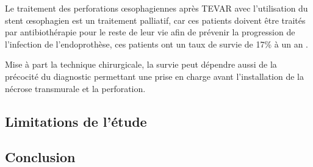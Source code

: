 \documentclass[./tfe.tex]{subfiles}
\begin{document}


Le traitement des perforations œsophagiennes après TEVAR avec l'utilisation du stent œsophagien est un traitement palliatif, car ces patients doivent être traités par antibiothérapie pour le reste de leur vie afin de prévenir la progression de l'infection de l'endoprothèse, ces patients ont un taux de survie de 17\% à un an \cite{czerny_new_2014}.

Mise à part la technique chirurgicale, la survie peut dépendre aussi de la précocité du diagnostic permettant une prise en charge avant l’installation de la nécrose transmurale et la perforation.

\subsection*{Limitations de l’étude}


\subsection*{Conclusion}

\end{document}
